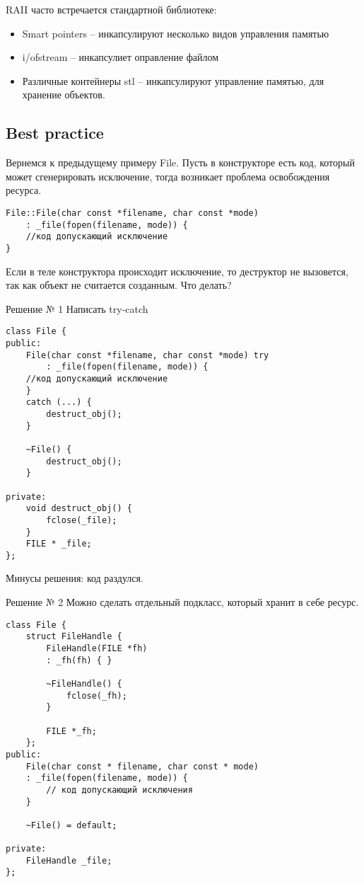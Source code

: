 RAII часто встречается стандартной библиотеке:
\begin{itemize}
\item Smart pointers -- инкапсулируют несколько видов управления памятью
\item i/ofstream -- инкапсулиет оправление файлом
\item Различные контейнеры stl -- инкапсулируют управление памятью, для хранение объектов.
\end{itemize}

\subsection{Best practice}

Вернемся к предыдущему примеру File.
Пусть в конструкторе есть код, который может сгенерировать исключение, тогда возникает проблема освобождения ресурса.

\begin{verbatim}
File::File(char const *filename, char const *mode)
    : _file(fopen(filename, mode)) {
    //код допускающий исключение
}
\end{verbatim}
Если в теле конструктора происходит исключение, то деструктор не вызовется, так как объект не считается созданным. Что делать?

Решение № 1
Написать try-catch
\begin{verbatim}
class File {
public:
    File(char const *filename, char const *mode) try
        : _file(fopen(filename, mode)) {
    //код допускающий исключение
    }
    catch (...) {
        destruct_obj();
    }

    ~File() {
        destruct_obj();
    }

private:
    void destruct_obj() {
        fclose(_file);
    }
    FILE * _file;
};
\end{verbatim}
Минусы решения: код раздулся.

Решение № 2
Можно сделать отдельный подкласс, который хранит в себе ресурс.
\begin{verbatim}
class File {
    struct FileHandle {
        FileHandle(FILE *fh)
        : _fh(fh) { }

        ~FileHandle() {
            fclose(_fh);
        }

        FILE *_fh;
    };
public:
    File(char const * filename, char const * mode)
    : _file(fopen(filename, mode)) {
        // код допускающий исключения
    }

    ~File() = default;

private:
    FileHandle _file;
};
\end{verbatim}

